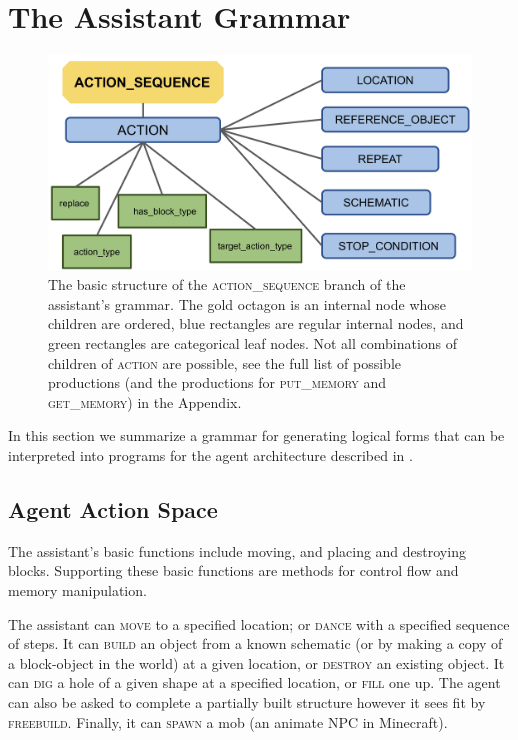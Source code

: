 \section{The Assistant Grammar}
\label{sec:grammar}
\begin{figure}
	\centering
     \includegraphics[width=.72\linewidth ]{figures/AS.png}

    \caption{The basic structure of the \textsc{action\_sequence} branch of the assistant's grammar.   The gold octagon is an internal node whose children are ordered,  blue rectangles are regular internal nodes,  and green rectangles are categorical leaf nodes.   Not all combinations of children of \textsc{action} are possible, see the full list of possible productions (and the productions for \textsc{put\_memory} and \textsc{get\_memory})  in the Appendix.}
    \label{fig:AS}
    
\end{figure}


 In this section we summarize a grammar for generating logical forms that can be interpreted into programs for the agent architecture described in \cite{gray2019craftassist}.

\subsection{Agent Action Space}
The assistant's basic functions include moving, and placing and destroying blocks.  Supporting these basic functions are methods for control flow and memory manipulation.  

\smallskip

 The assistant can \textsc{move} to a specified location; or \textsc{dance} with a specified sequence of steps.  It can \textsc{build} an object from a known schematic (or by making a copy of a block-object in the world) at a given location, or \textsc{destroy} an existing object.  It can \textsc{dig} a hole of a given shape at a specified location, or \textsc{fill} one up. The agent can also be asked to complete a partially built structure however it sees fit by \textsc{freebuild}.  Finally, it can \textsc{spawn} a mob (an animate NPC in Minecraft).    

